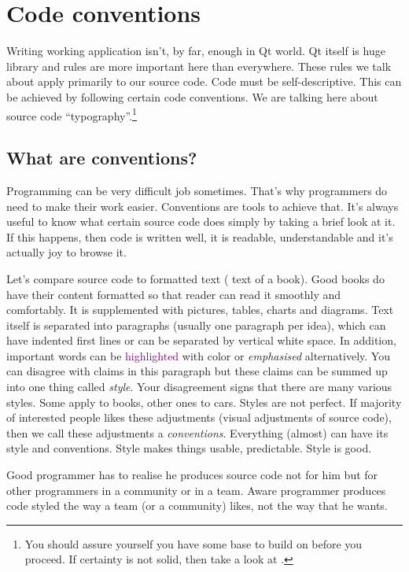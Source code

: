 \section{Code conventions}
Writing working application isn't, by far, enough in Qt world. Qt itself is huge library and rules are more important here than everywhere. These rules we talk about apply primarily to our source code. Code must be self-descriptive. This can be achieved by following certain code conventions. We are talking here about source code \enquote{typography}.\footnote{You should assure yourself you have some base to build on before you proceed. If certainty is not solid, then take a look at \citep[p.~40-77]{mcconnell:codecomplete}.}

\subsection{What are conventions?}
Programming can be very difficult job sometimes. That's why programmers do need to make their work easier. Conventions are tools to achieve that. It's always useful to know what certain source code does simply by taking a brief look at it. If this happens, then code is written well, it is readable, understandable and it's actually joy to browse it.

Let's compare source code to formatted text (\eg{} text of a book). Good books do have their content formatted so that reader can read it smoothly and comfortably. It is supplemented with pictures, tables, charts and diagrams. Text itself is separated into paragraphs (usually one paragraph per idea), which can have indented first lines or can be separated by vertical white space. In addition, important words can be \textcolor{purple}{highlighted} with color or \emph{emphasised} alternatively. You can disagree with claims in this paragraph but these claims can be summed up into one thing called \emph{style}. Your disagreement signs that there are many various styles. Some apply to books, other ones to cars. Styles are not perfect. If majority of interested people likes these adjustments (\eg visual adjustments of source code), then we call these adjustments a \emph{conventions}. Everything (almost) can have its style and conventions. Style makes things usable, predictable. Style 
is good.

Good programmer has to realise he produces source code not for him but for other programmers in a community or in a team. Aware programmer produces code styled the way a team (or a community) likes, not the way that he wants.

